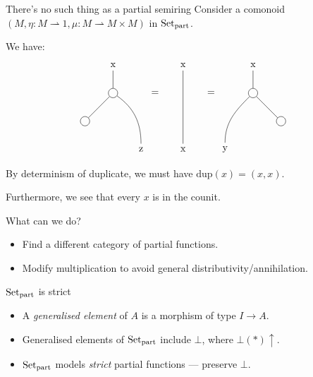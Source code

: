 \documentclass[fleqn]{beamer}
\begin{document}
\begin{frame}{There's no such thing as a partial semiring}
  Consider a comonoid
  $(M, \eta : M \rightharpoonup 1, \mu : M \rightharpoonup M \times M)$ in
  $\operatorname{Set}_{\mathrm{part}}$.

  We have:
  \[
    \begin{tikzpicture}[baseline]
      \path
      (-3.5,-1) node[circle,draw](0l) {}
      (-1.5,-2) node(xl) {z}
      (-2.5,0) node[circle,draw](+l) {}
      (-2.5,1) node(resl) {x}
      ;

      \draw (0l) -- (+l);
      \draw (xl) to[out=90,in=325] (+l);
      \draw (+l) -- (resl);

      \node at (-1,0) {=};

      \path
      (0,-2) node(x) {x}
      (0,1) node(res) {x}
      ;

      \draw (x) -- (res);

      \node at (1,0) {=};

      \path
      (3.5,-1) node[circle,draw](0) {}
      (1.5,-2) node(x) {y}
      (2.5,0) node[circle,draw](+) {}
      (2.5,1) node(res) {x}
      ;

      \draw (0) -- (+);
      \draw (x) to[out=90,in=225] (+);
      \draw (+) -- (res);
    \end{tikzpicture}
  \]

  By determinism of duplicate, we must have $\mathrm{dup}(x) = (x, x)$.

  Furthermore, we see that every $x$ is in the counit.
\end{frame}

\begin{frame}{What can we do?}
  \begin{itemize}
    \item Find a different category of partial functions.
    \item Modify multiplication to avoid general distributivity/annihilation.
  \end{itemize}
\end{frame}

\begin{frame}{$\operatorname{Set}_{\mathrm{part}}$ is strict}
  \begin{itemize}
    \item A \emph{generalised element} of $A$ is a morphism of type $I \to A$.
    \item Generalised elements of $\operatorname{Set}_{\mathrm{part}}$ include $\bot$, where
      $\bot({*})\uparrow$.
    \item $\operatorname{Set}_{\mathrm{part}}$ models \emph{strict} partial functions ---
      preserve $\bot$.
  \end{itemize}
\end{frame}
\end{document}
